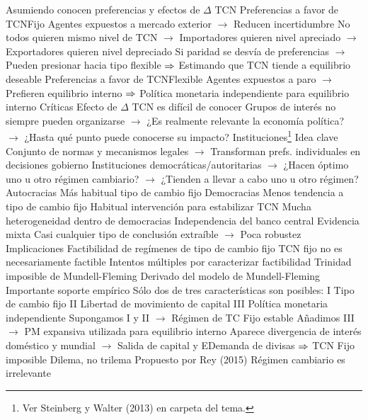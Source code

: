 \documentclass{nuevotema}
\begin{document}
\begin{esquemal}
				\4[] Asumiendo conocen preferencias y efectos de $\Delta$ TCN
				\4 Preferencias a favor de TCNFijo
				\4[] Agentes expuestos a mercado exterior
				\4[] $\to$ Reducen incertidumbre
				\4[] No todos quieren mismo nivel de TCN
				\4[] $\to$ Importadores quieren nivel apreciado
				\4[] $\to$ Exportadores quieren nivel depreciado
				\4[] Si paridad se desvía de preferencias
				\4[] $\to$ Pueden presionar hacia tipo flexible
				\4[] $\Rightarrow$ Estimando que TCN tiende a equilibrio deseable
				\4 Preferencias a favor de TCNFlexible
				\4[] Agentes expuestos a paro
				\4[] $\to$ Prefieren equilibrio interno
				\4[] $\Rightarrow$ Política monetaria independiente para equilibrio interno
				\4 Críticas
				\4[] Efecto de $\Delta$ TCN es difícil de conocer
				\4[] Grupos de interés no siempre pueden organizarse
				\4[] $\to$ ¿Es realmente relevante la economía política?
				\4[] $\to$ ¿Hasta qué punto puede conocerse su impacto?
			\3 Instituciones\footnote{Ver Steinberg y Walter (2013) en carpeta del tema.}
				\4 Idea clave
				\4[] Conjunto de normas y mecanismos legales
				\4[] $\to$ Transforman prefs. individuales en decisiones gobierno
				\4[] Instituciones democráticas/autoritarias
				\4[] $\to$ ¿Hacen óptimo uno u otro régimen cambiario?
				\4[] $\to$ ¿Tienden a llevar a cabo uno u otro régimen?
				\4 Autocracias
				\4[] Más habitual tipo de cambio fijo
				\4 Democracias
				\4[] Menos tendencia a tipo de cambio fijo
				\4[] Habitual intervención para estabilizar TCN
				\4[] Mucha heterogeneidad dentro de democracias
				\4 Independencia del banco central
				\4[] Evidencia mixta
				\4[] Casi cualquier tipo de conclusión extraíble
				\4[] $\to$ Poca robustez
		\2 Implicaciones
			\3 Factibilidad de regímenes de tipo de cambio fijo
				\4 TCN fijo no es necesariamente factible
				\4 Intentos múltiples por caracterizar factibilidad
				\4 Trinidad imposible de Mundell-Fleming
				\4[] Derivado del modelo de Mundell-Fleming
				\4[] Importante soporte empírico
				\4[] Sólo dos de tres características son posibles:
				\4[] \textsc{I} Tipo de cambio fijo
				\4[] \textsc{II} Libertad de movimiento de capital
				\4[] \textsc{III} Política monetaria independiente
				\4[] Supongamos I y II
				\4[] $\to$ Régimen de TC Fijo estable
				\4[] Añadimos III
				\4[] $\to$ PM expansiva utilizada para equilibrio interno
				\4[] Aparece divergencia de interés doméstico y mundial
				\4[] $\to$ Salida de capital y EDemanda de divisas
				\4[] $\Rightarrow$ TCN Fijo imposible
				\4 Dilema, no trilema
				\4[] Propuesto por Rey (2015)
				\4[] Régimen cambiario es irrelevante

\end{esquemal}
\end{document}
